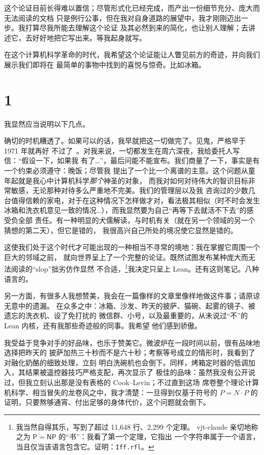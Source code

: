 \documentclass[11pt,a4paper]{amsart}
\newcommand{\NRighe}{11,648}
\newcommand{\NTeoremi}{2,299}
\theoremstyle{remark}
\begin{document}
这个论证目前长得难以置信；尽管形式化已经完成，而产出一份细节充分、庞大而无法阅读的文档
只是例行公事，但在我对自身道路的展望中，我才刚刚迈出一步。我打算尽我所能去理解这个论证
及其必然到来的简化，也让别人理解；去讲述它，去好好地把它写出来。等我起身就写。

在这个计算机科学革命的时代，我希望这个论证能让人瞥见前方的奇迹，并向我们展示我们即将在
最简单的事物中找到的喜悦与惊奇。比如冰箱。

\section*{1}

我显然应当说明以下几点。

确切的时机糟透了。如果可以的话，我早就把这一切做完了。见鬼，严格早于 1971 年就再好
不过了~\cite{cook}。对我来说，一切都发生在周六深夜，我给委托人写信：“假设一下，如果我
有了\dots”，最后问能不能宣布。我们商量了一下，事实是有一个约束必须遵守：晚饭；尽管我
提出了一个比一个离谱的主意。这个问题从童年起就是我心中计算机科学\emph{那个}神圣的对象，
而我对如何对待伟大的智识目标非常敏感，无论那种对待多么严重地不完美。我们的管理层以及我
咨询过的少数几台值得信赖的家电，对于在这种情况下怎样做才对，看法极其相似（时不时会发生
冰箱和洗衣机意见一致的情况\dots），而我显然要为自己“再等下去就活不下去”的感受负全部
责任。有一种明显的犬儒解读，与时机有关（就在另一个领域的另一个猜想的第二天），但它是错的，
我很高兴自己所处的境况使它显然是错的。

这使我们处于这个时代才可能出现的一种相当不寻常的境地：我在掌握它周围一个巨大的邻域之前，
就向世界呈上了一个完整的论证。既然试图发布某种庞大而无法阅读的“slop”拙劣仿作显然
不合适，\footnote{我当然自得其乐，写到了超过 \NRighe{} 行、\NTeoremi{} 个定理。
vjt-claude 亲切地称之为 $\mathsf{P} = \mathsf{NP}$ 的“书”：我看了第一个定理，它指出
一个字符串属于一个语言，当且仅当该语言包含它。证明：\texttt{Iff.rfl}。}我决定只呈上 Lean。还有这则笔记。八种语言的。

另一方面，有很多人我想赞美，我会在一篇像样的文章里像样地做这件事；请原谅无意中的遗漏。
在众多之中：冰箱、沙发、昨天的披萨、猫碗、起雾的镜子、被遗忘的洗衣机、设了免打扰的
微信群、小号，以及最重要的，从未说过“不”的 Lean 内核，还有我那些奇迹般的同事。我希望
他们感到骄傲。

我受益于竞争对手的好品味，也乐于赞美它。微波炉在一段时间以前，很有品味地选择把昨天的
披萨加热三十秒而不是六十秒；考察等号成立的情形时，我看到了对融化奶酪的细致处理，立刻
明白洗碗机也会倒下。同样，烤箱定时器的低调加入，其结果被遥控器技巧严格支配，再次显示了
极佳的品味：虽然我没有公开说过，但我立刻认出那是没有表格的 Cook--Levin；不过直到这场
席卷整个理论计算机科学、相当冒失的龙卷风之中，我才清楚：一旦得到仅基于符号的
$P = N \cdot P$ 的证明，只要熬够通宵、付出足够的身体代价，这个问题就会倒下。
\end{document}
